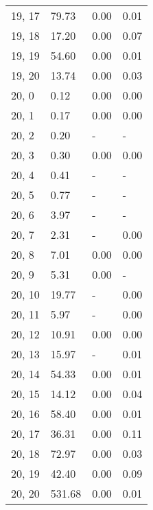 \begin{table}
\begin{tabular}{llll}
19, 17 &   79.73 &  0.00 &  0.01 \\
19, 18 &   17.20 &  0.00 &  0.07 \\
19, 19 &   54.60 &  0.00 &  0.01 \\
19, 20 &   13.74 &  0.00 &  0.03 \\
20, 0  &    0.12 &  0.00 &  0.00 \\
20, 1  &    0.17 &  0.00 &  0.00 \\
20, 2  &    0.20 &     - &     - \\
20, 3  &    0.30 &  0.00 &  0.00 \\
20, 4  &    0.41 &     - &     - \\
20, 5  &    0.77 &     - &     - \\
20, 6  &    3.97 &     - &     - \\
20, 7  &    2.31 &     - &  0.00 \\
20, 8  &    7.01 &  0.00 &  0.00 \\
20, 9  &    5.31 &  0.00 &     - \\
20, 10 &   19.77 &     - &  0.00 \\
20, 11 &    5.97 &     - &  0.00 \\
20, 12 &   10.91 &  0.00 &  0.00 \\
20, 13 &   15.97 &     - &  0.01 \\
20, 14 &   54.33 &  0.00 &  0.01 \\
20, 15 &   14.12 &  0.00 &  0.04 \\
20, 16 &   58.40 &  0.00 &  0.01 \\
20, 17 &   36.31 &  0.00 &  0.11 \\
20, 18 &   72.97 &  0.00 &  0.03 \\
20, 19 &   42.40 &  0.00 &  0.09 \\
20, 20 &  531.68 &  0.00 &  0.01 \\
\bottomrule
\end{tabular}
\end{table}
